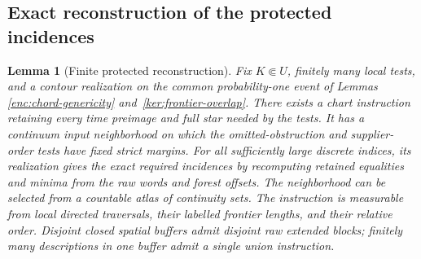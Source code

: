 \documentclass[11pt]{article}
\numberwithin{equation}{section}
\newtheorem{lemma}[theorem]{Lemma}
\theoremstyle{definition}
\theoremstyle{remark}
\newcommand{\1}{\mathbf 1}
\begin{document}
\subsection{Exact reconstruction of the protected incidences}

\begin{lemma}[Finite protected reconstruction]\label{ker:incidences}
Fix \(K\Subset U\), finitely many local tests, and a contour realization
on the common probability-one event of Lemmas
\ref{enc:chord-genericity} and~\ref{ker:frontier-overlap}.
There exists a chart instruction retaining every time preimage and
full star needed by the tests.  It has a continuum input neighborhood
on which the omitted-obstruction and supplier-order tests have fixed
strict margins.  For all sufficiently large discrete indices, its
realization gives the exact required incidences by recomputing
retained equalities and minima from the raw words and forest offsets.
The neighborhood can be selected from a countable atlas of continuity
sets.  The instruction is measurable from local directed traversals,
their labelled frontier lengths, and their relative order.
Disjoint closed spatial buffers admit disjoint raw extended blocks;
finitely many descriptions in one buffer admit a single union instruction.
\end{lemma}
\end{document}
